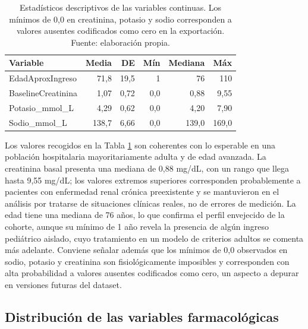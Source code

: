 \documentclass[12pt, a4paper, oneside]{report}
\begin{document}
\begin{table}[h]
    \centering
    \begin{tabular}{lrrrrr}
        \toprule
        \textbf{Variable} & \textbf{Media} & \textbf{DE} & \textbf{Mín} & \textbf{Mediana} & \textbf{Máx} \\
        \midrule
        EdadAproxIngreso     & 71,8  & 19,5 & 1    & 76    & 110   \\
        BaselineCreatinina   & 1,07  & 0,72 & 0,0  & 0,88  & 9,55  \\
        Potasio\_mmol\_L     & 4,29  & 0,62 & 0,0  & 4,20  & 7,90  \\
        Sodio\_mmol\_L       & 138,7 & 6,66 & 0,0  & 139,0 & 169,0 \\
        \bottomrule
    \end{tabular}
    \caption{Estadísticos descriptivos de las variables continuas. Los mínimos de 0,0 en creatinina, potasio y sodio corresponden a valores ausentes codificados como cero en la exportación. Fuente: elaboración propia.}
    \label{tab:descriptivos}
\end{table}

Los valores recogidos en la Tabla \ref{tab:descriptivos} son coherentes con lo esperable en una población hospitalaria mayoritariamente adulta y de edad avanzada. La creatinina basal presenta una mediana de 0,88 mg/dL, con un rango que llega hasta 9,55 mg/dL; los valores extremos superiores corresponden probablemente a pacientes con enfermedad renal crónica preexistente y se mantuvieron en el análisis por tratarse de situaciones clínicas reales, no de errores de medición. La edad tiene una mediana de 76 años, lo que confirma el perfil envejecido de la cohorte, aunque su mínimo de 1 año revela la presencia de algún ingreso pediátrico aislado, cuyo tratamiento en un modelo de criterios adultos se comenta más adelante. Conviene señalar además que los mínimos de 0,0 observados en sodio, potasio y creatinina son fisiológicamente imposibles y corresponden con alta probabilidad a valores ausentes codificados como cero, un aspecto a depurar en versiones futuras del dataset.

\subsection{Distribución de las variables farmacológicas}
\end{document}
